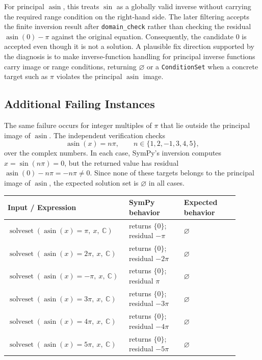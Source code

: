 \documentclass[11pt]{article}
\begin{document}
For principal \(\operatorname{asin}\), this treats \(\sin\) as a globally valid inverse
without carrying the required range condition on the right-hand side.  The
later filtering accepts the finite inversion result after \texttt{domain\_check}
rather than checking the residual \(\operatorname{asin}(0)-\pi\) against the original
equation.  Consequently, the candidate \(0\) is accepted even though it is not
a solution.  A plausible fix direction supported by the diagnosis is to make
inverse-function handling for principal inverse functions carry image or range
conditions, returning \(\varnothing\) or a \texttt{ConditionSet} when a concrete
target such as \(\pi\) violates the principal \(\operatorname{asin}\) image.

\subsection{Additional Failing Instances}

The same failure occurs for integer multiples of \(\pi\) that lie outside the
principal image of \(\operatorname{asin}\).  The independent verification checks
\[
  \operatorname{asin}(x)=n\pi,\qquad n\in\{1,2,-1,3,4,5\},
\]
over the complex numbers.  In each case, SymPy's inversion computes
\(x=\sin(n\pi)=0\), but the returned value has residual
\(\operatorname{asin}(0)-n\pi=-n\pi\ne0\).  Since none of these targets belongs to the
principal image of \(\operatorname{asin}\), the expected solution set is \(\varnothing\) in
all cases.

\begin{center}
\small
\renewcommand{\arraystretch}{1.3}
\begin{tabular}{@{}>{\raggedright\arraybackslash}p{0.44\linewidth}>{\raggedright\arraybackslash}p{0.23\linewidth}>{\raggedright\arraybackslash}p{0.23\linewidth}@{}}
\toprule
\textbf{Input / Expression} & \textbf{SymPy behavior} & \textbf{Expected behavior} \\
\midrule
\(\operatorname{solveset}(\operatorname{asin}(x)=\pi,\ x,\ \mathbb{C})\) & returns \(\{0\}\); residual \(-\pi\) & \(\varnothing\) \\
\(\operatorname{solveset}(\operatorname{asin}(x)=2\pi,\ x,\ \mathbb{C})\) & returns \(\{0\}\); residual \(-2\pi\) & \(\varnothing\) \\
\(\operatorname{solveset}(\operatorname{asin}(x)=-\pi,\ x,\ \mathbb{C})\) & returns \(\{0\}\); residual \(\pi\) & \(\varnothing\) \\
\(\operatorname{solveset}(\operatorname{asin}(x)=3\pi,\ x,\ \mathbb{C})\) & returns \(\{0\}\); residual \(-3\pi\) & \(\varnothing\) \\
\(\operatorname{solveset}(\operatorname{asin}(x)=4\pi,\ x,\ \mathbb{C})\) & returns \(\{0\}\); residual \(-4\pi\) & \(\varnothing\) \\
\(\operatorname{solveset}(\operatorname{asin}(x)=5\pi,\ x,\ \mathbb{C})\) & returns \(\{0\}\); residual \(-5\pi\) & \(\varnothing\) \\
\bottomrule
\end{tabular}
\end{center}
\end{document}

